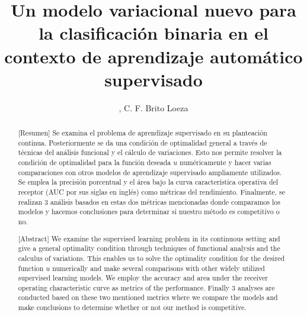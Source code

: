 \documentclass{INGUADY}
\begin{document}
\title{Un modelo variacional nuevo para la clasificación binaria en el contexto de aprendizaje automático supervisado}

\author {
	 ,
	C. F. Brito Loeza
}


\begin{frontmatter}


\begin{abstract}[Resumen]
Se examina el problema de aprendizaje supervisado en su planteación continua. Posteriormente se da una condición de optimalidad general a través de técnicas del análisis funcional y el cálculo de variaciones. Esto nos permite resolver la condición de optimalidad para la función deseada $u$ numéricamente y hacer varias comparaciones con otros modelos de aprendizaje supervisado ampliamente utilizados. Se emplea la precisión porcentual y el área bajo la curva característica operativa del receptor (AUC por sus siglas en inglés) como métricas del rendimiento. Finalmente, se realizan 3 análisis basados en estas dos métricas mencionadas donde comparamos los modelos y hacemos conclusiones para determinar si nuestro método es competitivo o no.

\end{abstract}


\begin{abstract}[Abstract]
We examine the supervised learning problem in its continuous setting and give a general optimality condition through techniques of functional analysis and the calculus of variations. This enables us to solve the optimality condition for the desired function $u$ numerically and make several comparisons with other widely utilized supervised learning models. We employ the accuracy and area under the receiver operating characteristic curve as metrics of the performance. Finally 3 analyses are conducted based on these two mentioned metrics where we compare the models and make conclusions to determine whether  or not our method is competitive. 


\end{abstract}
\end{frontmatter}
\end{document}
